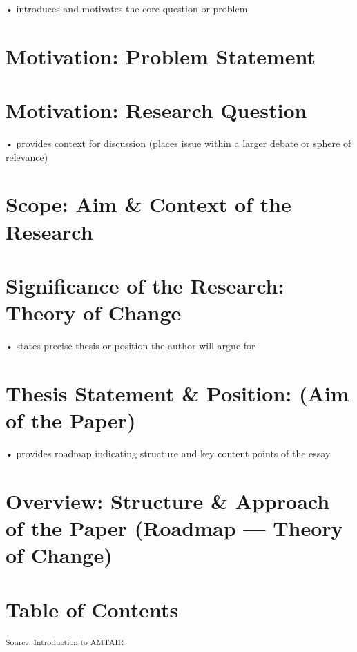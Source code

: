 \documentclass[12pt,a4paper]{book}      %
\begin{document}
• introduces and motivates the core question or problem

\section{Motivation: Problem
Statement}\label{motivation-problem-statement}

\section{Motivation: Research
Question}\label{motivation-research-question}

• provides context for discussion (places issue within a larger debate
or sphere of relevance)

\section{Scope: Aim \& Context of the
Research}\label{scope-aim-context-of-the-research}

\section{Significance of the Research: Theory of
Change}\label{significance-of-the-research-theory-of-change}

• states precise thesis or position the author will argue for

\section{Thesis Statement \& Position: (Aim of the
Paper)}\label{thesis-statement-position-aim-of-the-paper}

• provides roadmap indicating structure and key content points of the
essay

\section{Overview: Structure \& Approach of the Paper (Roadmap ---
Theory of
Change)}\label{overview-structure-approach-of-the-paper-roadmap-theory-of-change}

\section{Table of Contents}\label{table-of-contents}

\textsubscript{Source:
\href{https://VJMeyer.github.io/submission/chapters/Introduction.qmd.html\#66bd90b0-93dd-48d8-b27c-b8ec96fc40e0}{Introduction
to AMTAIR}}
\end{document}
